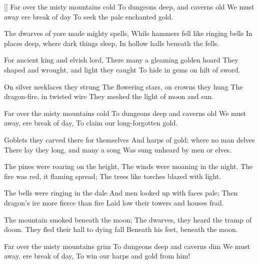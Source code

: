 \begin{intersong*}
\end{intersong*}
[]
\beginverse
Far over the misty mountains cold
To dungeons deep, and caverns old
We must away ere break of day
To seek the pale enchanted gold.
\endverse

\beginverse
The dwarves of yore made mighty spells,
While hammers fell like ringing bells
In places deep, where dark things sleep,
In hollow halls beneath the fells.
\endverse

\beginverse
For ancient king and elvish lord,
There many a gleaming golden hoard
They shaped and wrought, and light they caught
To hide in gems on hilt of sword.
\endverse

\beginverse
On silver necklaces they strung
The flowering stars, on crowns they hung
The dragon-fire, in twisted wire
They meshed the light of moon and sun.
\endverse

\beginverse
Far over the misty mountains cold
To dungeons deep and caverns old
We must away, ere break of day,
To claim our long-forgotten gold.
\endverse

\beginverse
Goblets they carved there for themselves
And harps of gold; where no man delves
There lay they long, and many a song
Was sung unheard by men or elves.
\endverse

\beginverse
The pines were roaring on the height,
The winds were moaning in the night.
The fire was red, it flaming spread;
The trees like torches blazed with light. 
\endverse

\beginverse
The bells were ringing in the dale
And men looked up with faces pale;
Then dragon's ire more fierce than fire
Laid low their towers and houses frail.
\endverse

\beginverse
The mountain smoked beneath the moon;
The dwarves, they heard the tramp of doom.
They fled their hall to dying fall
Beneath his feet, beneath the moon.
\endverse

\beginverse
Far over the misty mountains grim
To dungeons deep and caverns dim
We must away, ere break of day,
To win our harps and gold from him!
\endverse
\endsong